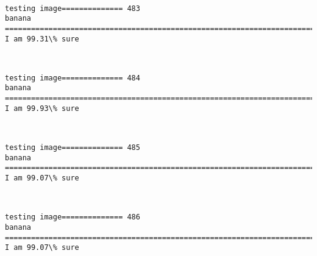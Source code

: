 \documentclass[11pt]{article}
\begin{document}
    \begin{center}
    \end{center}
    { \hspace*{\fill} \\}
    
    \begin{Verbatim}[commandchars=\\\{\}]
testing image============== 483
banana
============================================================================
I am 99.31\% sure

    \end{Verbatim}

    \begin{center}
    \end{center}
    { \hspace*{\fill} \\}
    
    \begin{Verbatim}[commandchars=\\\{\}]
testing image============== 484
banana
============================================================================
I am 99.93\% sure

    \end{Verbatim}

    \begin{center}
    \end{center}
    { \hspace*{\fill} \\}
    
    \begin{Verbatim}[commandchars=\\\{\}]
testing image============== 485
banana
============================================================================
I am 99.07\% sure

    \end{Verbatim}

    \begin{center}
    \end{center}
    { \hspace*{\fill} \\}
    
    \begin{Verbatim}[commandchars=\\\{\}]
testing image============== 486
banana
============================================================================
I am 99.07\% sure

    \end{Verbatim}
\end{document}
